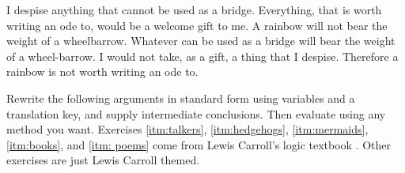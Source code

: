 \begin{exercises}



\item \label{itm:rainbow} I despise anything that cannot be used as a bridge. Everything, that is worth writing an ode to, would be a welcome gift to me. A rainbow will not bear the weight of a wheelbarrow.  Whatever can be used as a bridge will bear the weight of a wheel-barrow. I would not take, as a gift, a thing that I despise. Therefore a rainbow is not worth writing an ode to.

\end{exercises}

\noindent\problempart Rewrite the following arguments in standard form using variables and a translation key, and supply intermediate conclusions. Then evaluate using any method you want. Exercises \ref{itm:talkers}, \ref{itm:hedgehogs}, \ref{itm:mermaids}, \ref{itm:books}, and \ref{itm: poems} come from Lewis Carroll's logic textbook \citep{Dodgson1896}. Other exercises are just Lewis Carroll themed.

